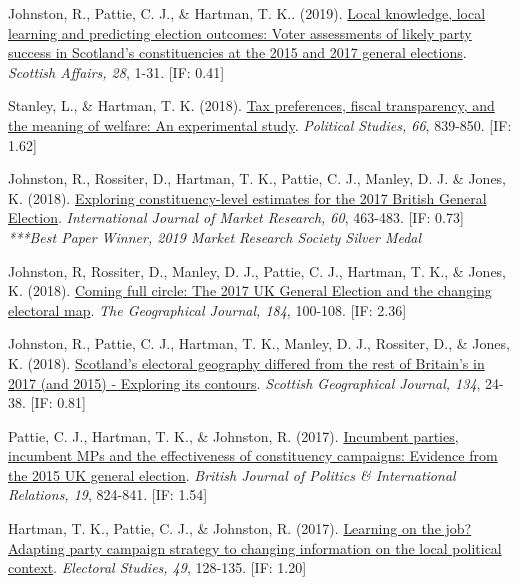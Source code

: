 \documentclass[12pt]{article}
\begin{document}
\begin{bibenum}
	\item Johnston, R., Pattie, C. J., \& {Hartman, T. K.}. (2019). 
		\href{https://10.3366/scot.2019.0263}
		{Local knowledge, local learning and predicting election outcomes: 
		Voter assessments of likely party success in Scotland's constituencies 
		at the 2015 and 2017 general elections}.
		\emph{Scottish Affairs, 28}, 1-31. [IF: 0.41]
		
	\item Stanley, L., \& {Hartman, T. K.} (2018).
          \href{https://10.1177/0032321717731661}
          {Tax preferences, fiscal transparency, and the meaning of welfare: 
          An experimental study}. 
          \emph{Political Studies, 66}, 839-850. [IF: 1.62]
          
	\item Johnston, R., Rossiter, D., {Hartman, T. K.}, Pattie, C. J., 
		   Manley, D. J. \&  Jones, K. (2018). 
		  \href{https://10.1177/1470785318778247}
		  {Exploring constituency-level estimates for the 2017 British General Election}.
		  \emph{International Journal of Market Research, 60}, 463-483. [IF: 0.73]\\
		  \textit{***Best Paper Winner, 2019 Market Research Society Silver Medal}

	\item Johnston, R, Rossiter, D., Manley, D. J., Pattie, C. J., 
		  {Hartman, T. K.}, \& Jones, K. (2018).
		  \href{https://10.1111/geoj.12240}
		  {Coming full circle: 
		  The 2017 UK General Election and the changing electoral map}. 
		  \emph{The Geographical Journal, 184}, 100-108. [IF: 2.36]
          
	\item Johnston, R., Pattie, C. J., {Hartman, T. K.}, Manley, D. J., 
		  Rossiter, D., \& Jones, K. (2018).
		  \href{https://10.1080/14702541.2017.1409362}
		  {Scotland's electoral geography 
		  differed from the rest of Britain's in 2017 (and 2015) - 
		  Exploring its contours}. 
		  \emph{Scottish Geographical Journal, 134}, 24-38. [IF: 0.81]
          
    \item Pattie, C. J., {Hartman, T. K.}, \& Johnston, R. (2017).
          \href{https://10.1177/1369148117718710}
          {Incumbent parties, incumbent MPs and the effectiveness of 
          constituency campaigns: Evidence from the 2015 UK general election}.
           \emph{British Journal of Politics \& International Relations, 19}, 824-841. [IF: 1.54]
          
    \item {Hartman, T. K.}, Pattie, C. J., \& Johnston, R. (2017).
    		\href{https://10.1016/j.electstud.2017.06.005}
          {Learning on the job? Adapting party campaign strategy 
          to changing information on the local political context}. 
          \emph{Electoral Studies, 49}, 128-135. [IF: 1.20]
          

\end{bibenum}
\end{document}
